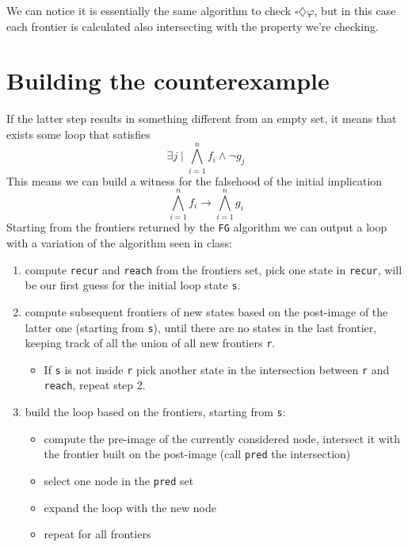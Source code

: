 \documentclass[10pt]{article}
\begin{document}
We can notice it is essentially the same algorithm to check
\(\square\diamondsuit \varphi\), but in this case each frontier is
calculated also intersecting with the property we're checking.

\section*{Building the counterexample}
\label{sec:org92e669f}
If the latter step results in something different from an empty set,
it means that exists some loop that satisfies \[\exists j \mid
  \bigwedge_{i=1}^n f_i \wedge \neg g_j\] This means we can build a
witness for the falsehood of the initial implication
\[\bigwedge_{i=1}^n f_i \to \bigwedge_{i=1}^n g_i\] Starting from
the frontiers returned by the \texttt{FG} algorithm we can output a loop
with a variation of the algorithm seen in class:

\begin{enumerate}
\item compute \texttt{recur} and \texttt{reach} from the frontiers set, pick one state
in \texttt{recur}, will be our first guess for the initial loop state
\texttt{s}.
\item compute subsequent frontiers of new states based on the
post-image of the latter one (starting from \texttt{s}), until there are
no states in the last frontier, keeping track of all the union of
all new frontiers \texttt{r}.
\begin{itemize}
\item If \texttt{s} is not inside \texttt{r} pick another state in the intersection
between \texttt{r} and \texttt{reach}, repeat step 2.
\end{itemize}
\item build the loop based on the frontiers, starting from \texttt{s}:
\begin{itemize}
\item compute the pre-image of the currently considered node,
intersect it with the frontier built on the post-image (call
\texttt{pred} the intersection)
\item select one node in the \texttt{pred} set
\item expand the loop with the new node
\item repeat for all frontiers
\end{itemize}
\end{enumerate}
\end{document}
